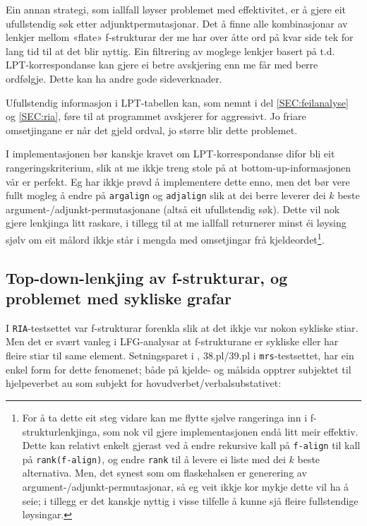 \documentclass[12pt,a4paper,oneside,draft]{report}
\begin{document}
Ein annan strategi, som iallfall løyser problemet med effektivitet, er
 å gjere eit ufullstendig søk etter adjunktpermutasjonar. Det å finne
 alle kombinasjonar av lenkjer mellom «flate» f-strukturar der me har
 over åtte ord på kvar side tek for lang tid til at det blir
 nyttig. Ein filtrering av moglege lenkjer basert på
 t.d. LPT-korrespondanse kan gjere ei betre avskjering enn me får med
 berre ordfølgje. Dette kan ha andre gode sideverknader.

Ufullstendig informasjon i LPT-tabellen kan, som nemnt i del
 \ref{SEC:feilanalyse} og \ref{SEC:ria}, føre til at programmet
 avskjerer for aggressivt. Jo friare omsetjingane er når det gjeld
 ordval, jo større blir dette problemet.

I implementasjonen bør kanskje kravet om LPT-korrespondanse difor bli
 eit rangeringskriterium, slik at me ikkje treng stole på at
 bottom-up-informasjonen vår er perfekt. Eg har ikkje prøvd å
 implementere dette enno, men det bør vere fullt mogleg å endre på
 \texttt{argalign} og \texttt{adjalign} slik at dei berre leverer dei $k$ beste
 argument-/adjunkt-permutasjonane (altså eit ufullstendig søk). Dette
 vil nok gjere lenkjinga litt raskare, i tillegg til at me iallfall
 returnerer minst éi løysing sjølv om eit målord ikkje står i mengda
 med omsetjingar frå kjeldeordet\footnote{For å ta dette eit steg vidare kan me flytte sjølve rangeringa
        inn i f-strukturlenkjinga, som nok vil gjere implementasjonen
        endå litt meir effektiv. Dette kan relativt enkelt gjerast ved
        å endre rekursive kall på \texttt{f-align} til kall på
        \texttt{rank(f-align)}, og endre \texttt{rank} til å levere ei liste med dei
        $k$ beste alternativa. Men, det synest som om flaskehalsen er
        generering av argument-/adjunkt-permutasjonar, så eg veit
        ikkje kor mykje dette vil ha å seie; i tillegg er det kanskje
        nyttig i visse tilfelle å kunne sjå fleire fullstendige
        løysingar. }.




\subsection{Top-down-lenkjing av f-strukturar, og problemet med sykliske grafar}
\label{sec-5.4.2}

    \label{SEC:reentrancy}

I \texttt{RIA}-testsettet var f-strukturar forenkla slik at det ikkje var
nokon sykliske stiar. Men det er svært vanleg i LFG-analysar at
f-strukturane er sykliske eller har fleire stiar til same
element. Setningsparet i \Next, 38.pl/39.pl i \texttt{mrs}-testsettet, har
ein enkel form for dette fenomenet; både på kjelde- og målsida opptrer
subjektet til hjelpeverbet au som subjekt for
hovudverbet/verbalsubstativet:
\end{document}

